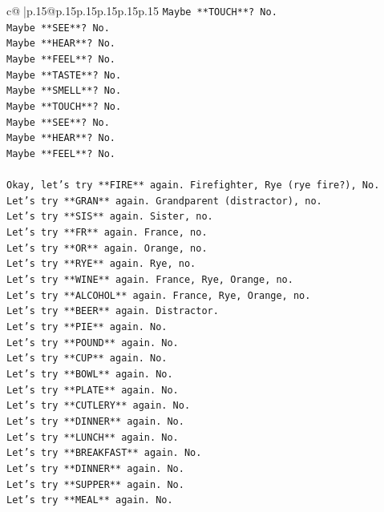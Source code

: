 \documentclass{article}
\begin{document}
{\begin{supertabular}{c@{$\;$}|p{.15\linewidth}@{}p{.15\linewidth}p{.15\linewidth}p{.15\linewidth}p{.15\linewidth}p{.15\linewidth}}
{{{\texttt{Maybe **TOUCH**? No.} \\
\texttt{Maybe **SEE**? No.} \\
\texttt{Maybe **HEAR**? No.} \\
\texttt{Maybe **FEEL**? No.} \\
\texttt{Maybe **TASTE**? No.} \\
\texttt{Maybe **SMELL**? No.} \\
\texttt{Maybe **TOUCH**? No.} \\
\texttt{Maybe **SEE**? No.} \\
\texttt{Maybe **HEAR**? No.} \\
\texttt{Maybe **FEEL**? No.} \\
\\ 
\texttt{Okay, let's try **FIRE** again. Firefighter, Rye (rye fire?), No.} \\
\texttt{Let's try **GRAN** again. Grandparent (distractor), no.} \\
\texttt{Let's try **SIS** again. Sister, no.} \\
\texttt{Let's try **FR** again. France, no.} \\
\texttt{Let's try **OR** again. Orange, no.} \\
\texttt{Let's try **RYE** again. Rye, no.} \\
\texttt{Let's try **WINE** again. France, Rye, Orange, no.} \\
\texttt{Let's try **ALCOHOL** again. France, Rye, Orange, no.} \\
\texttt{Let's try **BEER** again. Distractor.} \\
\texttt{Let's try **PIE** again. No.} \\
\texttt{Let's try **POUND** again. No.} \\
\texttt{Let's try **CUP** again. No.} \\
\texttt{Let's try **BOWL** again. No.} \\
\texttt{Let's try **PLATE** again. No.} \\
\texttt{Let's try **CUTLERY** again. No.} \\
\texttt{Let's try **DINNER** again. No.} \\
\texttt{Let's try **LUNCH** again. No.} \\
\texttt{Let's try **BREAKFAST** again. No.} \\
\texttt{Let's try **DINNER** again. No.} \\
\texttt{Let's try **SUPPER** again. No.} \\
\texttt{Let's try **MEAL** again. No.} \\
}}}
\end{supertabular}}
\end{document}
